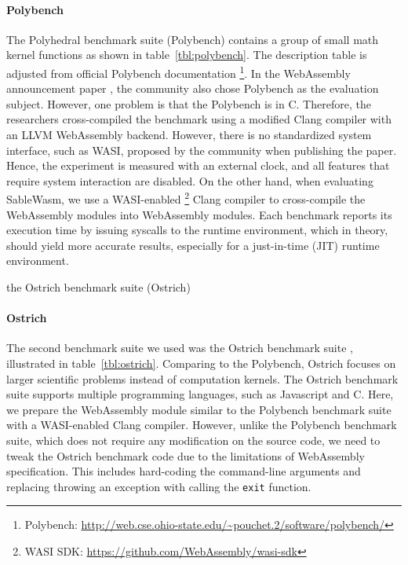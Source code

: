 \paragraph{Polybench}
The Polyhedral benchmark suite (Polybench) \cite{polybench} contains a group
of small math kernel functions as shown in table~\ref{tbl:polybench}. The
description table is adjusted from official Polybench documentation
\footnote{Polybench:
    \url{http://web.cse.ohio-state.edu/~pouchet.2/software/polybench/}}. In the
WebAssembly announcement paper \cite{10.1145/3062341.3062363}, the community
also chose Polybench as the evaluation subject. However, one problem is that
the Polybench is in C. Therefore, the researchers cross-compiled the benchmark
using a modified Clang compiler with an LLVM WebAssembly backend. However, there
is no standardized system interface, such as WASI, proposed by the community
when publishing the paper. Hence, the experiment is measured with an external
clock, and all features that require system interaction are disabled. On the
other hand, when evaluating SableWasm, we use a WASI-enabled
\footnote{WASI SDK: \url{https://github.com/WebAssembly/wasi-sdk}}
Clang compiler to cross-compile the WebAssembly modules into WebAssembly
modules. Each benchmark reports its execution time by issuing syscalls to the
runtime environment, which in theory, should yield more accurate results,
especially for a just-in-time (JIT) runtime environment.

\begin{table}
    \centering
    
    \caption{the Ostrich benchmark suite (Ostrich)}
    \label{tbl:ostrich}
\end{table}

\paragraph{Ostrich}
The second benchmark suite we used was the Ostrich benchmark suite
\cite{ostrich}, illustrated in table~\ref{tbl:ostrich}. Comparing to the
Polybench, Ostrich focuses on larger scientific problems instead of
computation kernels. The Ostrich benchmark suite supports multiple programming
languages, such as Javascript and C. Here, we prepare the WebAssembly module
similar to the Polybench benchmark suite with a WASI-enabled Clang compiler.
However, unlike the Polybench benchmark suite, which does not require any
modification on the source code, we need to tweak the Ostrich benchmark code
due to the limitations of WebAssembly specification. This includes hard-coding
the command-line arguments and replacing throwing an exception with
calling the \texttt{exit} function.

